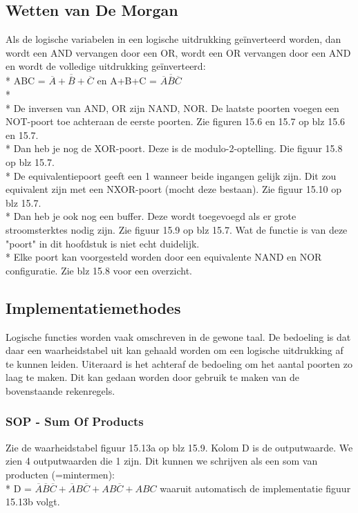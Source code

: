\documentclass[10pt]{article}
\begin{document}
\subsection{Wetten van De Morgan}
Als de logische variabelen in een logische uitdrukking ge\"inverteerd worden, dan wordt een AND vervangen door een OR, wordt een OR vervangen door een AND en wordt de volledige uitdrukking ge\"inverteerd:\\*
ABC = $\overline{\overline{A}+\overline{B}+\overline{C}}$ en A+B+C = $\overline{\overline{A}\overline{B}\overline{C}}$\\*\\*
De inversen van AND, OR zijn NAND, NOR. De laatste poorten voegen een NOT-poort toe achteraan de eerste poorten. Zie figuren 15.6 en 15.7 op blz 15.6 en 15.7.\\*
Dan heb je nog de XOR-poort. Deze is de modulo-2-optelling. Die figuur 15.8 op blz 15.7.\\*
De equivalentiepoort geeft een 1 wanneer beide ingangen gelijk zijn. Dit zou equivalent zijn met een NXOR-poort (mocht deze bestaan). Zie figuur 15.10 op blz 15.7.\\*
Dan heb je ook nog een buffer. Deze wordt toegevoegd als er grote stroomsterktes nodig zijn. Zie figuur 15.9 op blz 15.7. Wat de functie is van deze "poort" in dit hoofdstuk is niet echt duidelijk.\\*
Elke poort kan voorgesteld worden door een equivalente NAND en NOR configuratie. Zie blz 15.8 voor een overzicht.
\subsection{Implementatiemethodes}
Logische functies worden vaak omschreven in de gewone taal. De bedoeling is dat daar een waarheidstabel uit kan gehaald worden om een logische uitdrukking af te kunnen leiden. Uiteraard is het achteraf de bedoeling om het aantal poorten zo laag te maken. Dit kan gedaan worden door gebruik te maken van de bovenstaande rekenregels.
\subsubsection{SOP - Sum Of Products}
Zie de waarheidstabel figuur 15.13a op blz 15.9. Kolom D is de outputwaarde. We zien 4 outputwaarden die 1 zijn. Dit kunnen we schrijven als een som van producten (=mintermen):\\*
D = $\overline{A}\overline{B}\overline{C}+\overline{A}B\overline{C}+AB\overline{C}+ABC$ waaruit automatisch de implementatie figuur 15.13b volgt.
\end{document}
